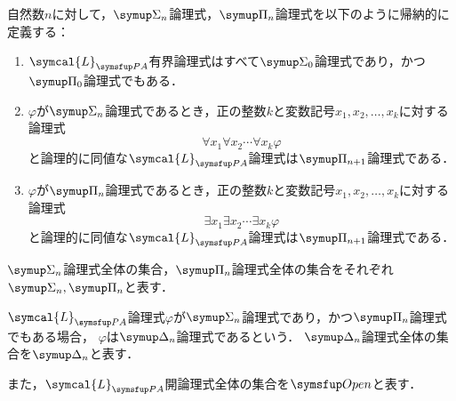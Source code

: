 \begin{Def}
	自然数\(n\)に対して，\(\SigmaFormula_n\)論理式，\(\PiFormula_n\)論理式を以下のように帰納的に定義する：
	\begin{enumerate}
		\item \(\symcal{L}_{\PA}\)有界論理式はすべて\(\SigmaFormula_0\)論理式であり，かつ\(\PiFormula_0\)論理式でもある．
		\item \(\varphi\)が\(\SigmaFormula_n\)論理式であるとき，正の整数\(k\)と変数記号\(x_1, x_2, \dots, x_k\)に対する論理式
		      \[
			      \forall x_1 \forall x_2 \dotsb \forall x_k \varphi
		      \]
		      と論理的に同値な\(\symcal{L}_{\PA}\)論理式は\(\PiFormula_{n+1}\)論理式である．
		\item \(\varphi\)が\(\PiFormula_n\)論理式であるとき，正の整数\(k\)と変数記号\(x_1, x_2, \dots, x_k\)に対する論理式
		      \[
			      \exists x_1 \exists x_2 \dotsb \exists x_k \varphi
		      \]
		      と論理的に同値な\(\symcal{L}_{\PA}\)論理式は\(\PiFormula_{n+1}\)論理式である．
	\end{enumerate}
	\(\SigmaFormula_n\)論理式全体の集合，\(\PiFormula_n\)論理式全体の集合をそれぞれ\(\SigmaFormula_n, \PiFormula_n\)と表す．

	\(\symcal{L}_{\PA}\)論理式\(\varphi\)が\(\SigmaFormula_n\)論理式であり，かつ\(\PiFormula_n\)論理式でもある場合，
	\(\varphi\)は\(\DeltaFormula_n\)論理式であるという．
	\(\DeltaFormula_n\)論理式全体の集合を\(\DeltaFormula_n\)と表す．

	また，\(\symcal{L}_{\PA}\)開論理式全体の集合を\(\OpenFormulaSet\)と表す．
\end{Def}



